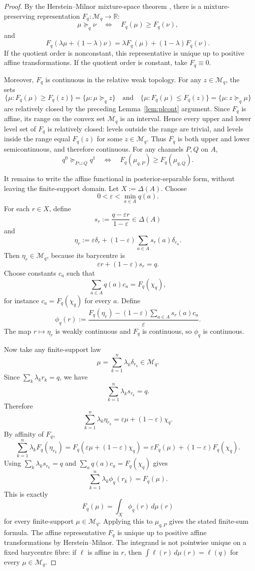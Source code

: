 \documentclass[11pt,a4paper]{article}
\theoremstyle{definition}
\newcommand{\R}{\mathbb R}
\newcommand{\1}{\mathbf 1}
\begin{document}
\begin{proof}
By the Herstein--Milnor mixture-space theorem \cite{HersteinMilnor1953}, there is a mixture-preserving representation
$F_q:\mathcal M_q\to\R$:
\[
\mu\succeq_q\nu
\quad\Longleftrightarrow\quad
F_q(\mu)\ge F_q(\nu),
\]
and
\[
F_q(\lambda\mu+(1-\lambda)\nu)
=
\lambda F_q(\mu)+(1-\lambda)F_q(\nu).
\]
If the quotient order is nonconstant, this representative is unique up to positive affine transformations.  If the
quotient order is constant, take $F_q\equiv0$.

Moreover, $F_q$ is continuous in the relative weak topology.  For any $z\in\mathcal M_q$, the sets
\[
\{\mu:F_q(\mu)\ge F_q(z)\}
=
\{\mu:\mu\succeq_q z\}
\quad\text{and}\quad
\{\mu:F_q(\mu)\le F_q(z)\}
=
\{\mu:z\succeq_q\mu\}
\]
are relatively closed by the preceding Lemma~\ref{lem:plcont} argument.  Since $F_q$ is affine, its range on the convex set
$\mathcal M_q$ is an interval.  Hence every upper and lower level set of $F_q$ is relatively closed: levels outside the
range are trivial, and levels inside the range equal $F_q(z)$ for some $z\in\mathcal M_q$.  Thus $F_q$ is both upper and
lower semicontinuous, and therefore continuous.  For any channels $P,Q$ on $A$,
\[
q^0\succeq_{P\sqcup Q}q^1
\quad\Longleftrightarrow\quad
F_q(\mu_{q,P})\ge F_q(\mu_{q,Q}).
\]

It remains to write the affine functional in posterior-separable form, without leaving the finite-support domain.  Let
$X:=\Delta(A)$.  Choose
\[
0<\varepsilon<\min_{a\in A}q(a).
\]
For each $r\in X$, define
\[
s_r:=\frac{q-\varepsilon r}{1-\varepsilon}\in\Delta(A)
\]
and
\[
\eta_r
:=
\varepsilon\delta_r+(1-\varepsilon)\sum_{a\in A}s_r(a)\delta_{e_a}.
\]
Then $\eta_r\in\mathcal M_q$, because its barycentre is
\[
\varepsilon r+(1-\varepsilon)s_r=q.
\]
Choose constants $c_a$ such that
\[
\sum_{a\in A}q(a)c_a=F_q(\chi_q),
\]
for instance $c_a=F_q(\chi_q)$ for every $a$.  Define
\[
\phi_q(r):=
\frac{
F_q(\eta_r)
-
(1-\varepsilon)\sum_{a\in A}s_r(a)c_a
}{\varepsilon}.
\]
The map $r\mapsto\eta_r$ is weakly continuous and $F_q$ is continuous, so $\phi_q$ is continuous.

Now take any finite-support law
\[
\mu=\sum_{k=1}^n\lambda_k\delta_{r_k}\in\mathcal M_q.
\]
Since $\sum_k\lambda_k r_k=q$, we have
\[
\sum_{k=1}^n\lambda_k s_{r_k}=q.
\]
Therefore
\[
\sum_{k=1}^n\lambda_k\eta_{r_k}
=
\varepsilon\mu+(1-\varepsilon)\chi_q.
\]
By affinity of $F_q$,
\[
\sum_{k=1}^n\lambda_k F_q(\eta_{r_k})
=
F_q\!\left(\varepsilon\mu+(1-\varepsilon)\chi_q\right)
=
\varepsilon F_q(\mu)+(1-\varepsilon)F_q(\chi_q).
\]
Using $\sum_k\lambda_k s_{r_k}=q$ and $\sum_a q(a)c_a=F_q(\chi_q)$ gives
\[
\sum_{k=1}^n\lambda_k\phi_q(r_k)=F_q(\mu).
\]
This is exactly
\[
F_q(\mu)=\int_X\phi_q(r)\,d\mu(r)
\]
for every finite-support $\mu\in\mathcal M_q$.  Applying this to $\mu_{q,P}$ gives the stated finite-sum formula.  The
affine representative $F_q$ is unique up to positive affine transformations by Herstein--Milnor.  The integrand is not
pointwise unique on a fixed barycentre fibre: if $\ell$ is affine in $r$, then $\int\ell(r)\,d\mu(r)=\ell(q)$ for every
$\mu\in\mathcal M_q$.
\end{proof}
\end{document}
